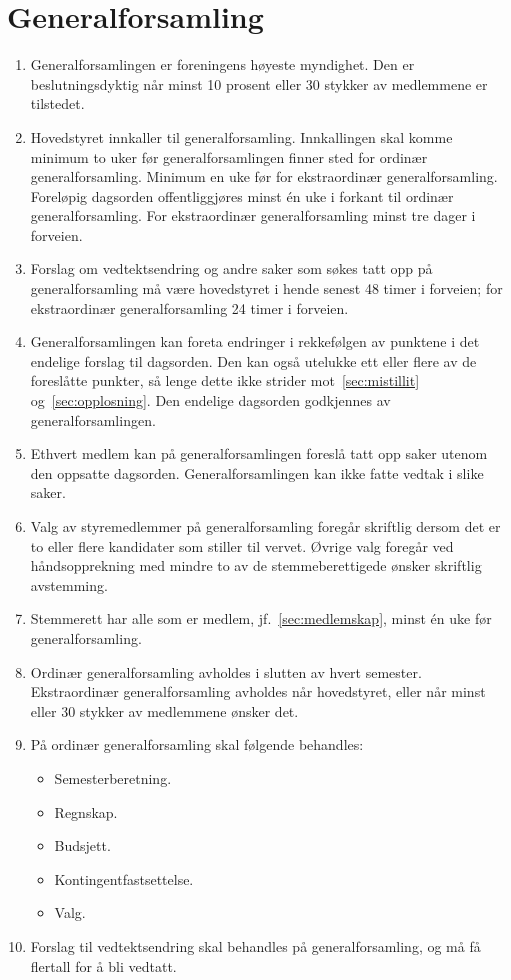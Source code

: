 \documentclass[8pt,norsk,a4paper]{article}
\begin{document}
\section{Generalforsamling}
\begin{enumerate}
	\item{Generalforsamlingen er foreningens høyeste myndighet. Den er beslutningsdyktig når minst 10 prosent eller 30 stykker av medlemmene er tilstedet.}
	\item{Hovedstyret innkaller til generalforsamling. Innkallingen skal komme minimum to uker før generalforsamlingen finner sted for ordinær generalforsamling. Minimum en uke før for ekstraordinær generalforsamling. Foreløpig dagsorden offentliggjøres minst én uke i forkant til ordinær generalforsamling. For ekstraordinær generalforsamling minst tre dager i forveien.}
	\item{Forslag om vedtektsendring og andre saker som søkes tatt opp på generalforsamling må være hovedstyret i hende senest 48 timer i forveien; for ekstraordinær generalforsamling 24 timer i forveien.}
	\item{Generalforsamlingen kan foreta endringer i rekkefølgen av punktene i det endelige forslag til dagsorden. Den kan også utelukke ett eller flere av de foreslåtte punkter, så lenge dette ikke strider mot~\ref{sec:mistillit} og~\ref{sec:opplosning}. Den endelige dagsorden godkjennes av generalforsamlingen.}
	\item{Ethvert medlem kan på generalforsamlingen foreslå tatt opp saker utenom den oppsatte dagsorden. Generalforsamlingen kan ikke fatte vedtak i slike saker.}
	\item{Valg av styremedlemmer på generalforsamling foregår skriftlig dersom det er to eller flere kandidater som stiller til vervet. Øvrige valg foregår ved håndsopprekning med mindre to av de stemmeberettigede ønsker skriftlig avstemming.}
	\item{Stemmerett har alle som er medlem, jf.~\ref{sec:medlemskap}, minst én uke før generalforsamling.}
	\item{Ordinær generalforsamling avholdes i slutten av hvert semester. Ekstraordinær generalforsamling avholdes når hovedstyret, eller når minst  eller 30 stykker av medlemmene ønsker det.}
	\item{På ordinær generalforsamling skal følgende behandles:}
	\begin{itemize}
		\item{Semesterberetning.}
		\item{Regnskap.}
		\item{Budsjett.}
		\item{Kontingentfastsettelse.}
		\item{Valg.}
	\end{itemize}
	\item{Forslag til vedtektsendring skal behandles på generalforsamling, og må få  flertall for å bli vedtatt.}
\end{enumerate}
\end{document}
